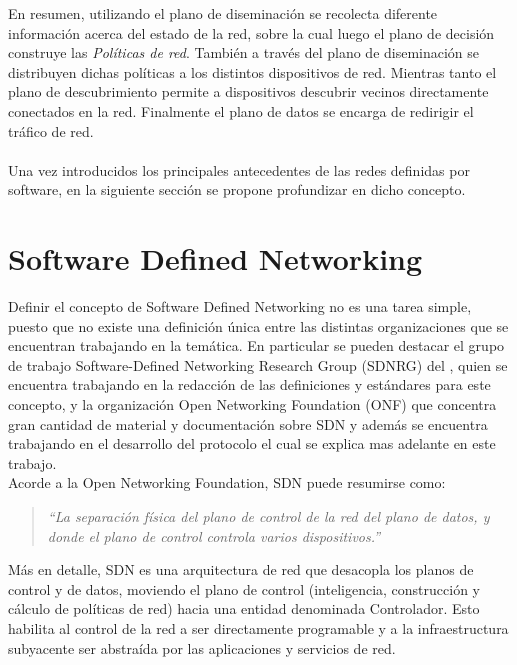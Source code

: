 En resumen, utilizando el plano de diseminación se recolecta diferente información acerca del estado de la red, sobre la cual luego el plano de decisión construye las \textit{Políticas de red}. También a través del plano de diseminación se distribuyen dichas políticas a los distintos dispositivos de red. Mientras tanto el plano de descubrimiento permite a dispositivos descubrir vecinos directamente conectados en la red. Finalmente el plano de datos se encarga de redirigir el tráfico de red.\\ \\

Una vez introducidos los principales antecedentes de las redes definidas por software, en la siguiente secci\'on se propone profundizar en dicho concepto.

\section{Software Defined Networking}
\label{section2.2}

Definir el concepto de Software Defined Networking no es una tarea simple, puesto que no existe una definici\'on \'unica entre las distintas organizaciones que se encuentran trabajando en la temática. En particular se pueden destacar el grupo de trabajo Software-Defined Networking Research Group (SDNRG) del , quien se encuentra trabajando en la redacción de las definiciones y estándares para este concepto, y la organización Open Networking Foundation (ONF)\cite{ONF} que concentra gran cantidad de material y documentación sobre SDN y adem\'as se encuentra trabajando en el desarrollo del protocolo  el cual se explica mas adelante en este trabajo.\\

Acorde a la Open Networking Foundation, SDN puede resumirse como:

\begin{quote}
\textit{``La separación física del plano de control de la red del plano de datos, y donde el plano de control controla varios dispositivos.''}
\end{quote}

Más en detalle, SDN es una arquitectura de red que desacopla los planos de control y de datos, moviendo el plano de control (inteligencia, construcción y c\'alculo de políticas de red) hacia una entidad denominada Controlador. Esto habilita al control de la red a ser directamente programable y a la infraestructura subyacente ser abstraída por las aplicaciones y servicios de red.\\ 

